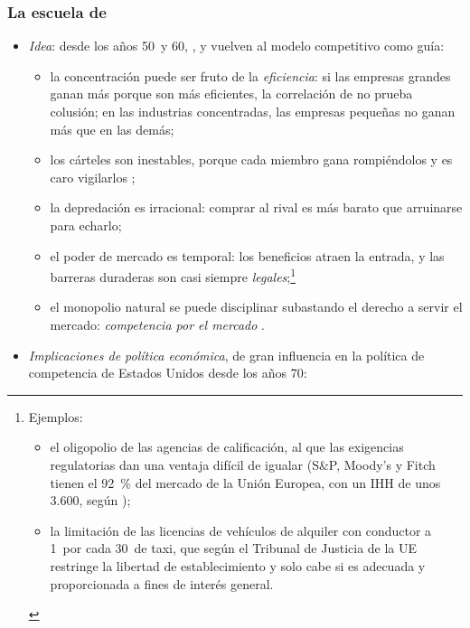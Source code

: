 \documentclass[11pt]{article}
\begin{document}
\subsubsection{La escuela de }\label{sec:chicago}

\begin{itemize}
\item \emph{Idea}: desde los años 50~y 60, \textcite{Stigler1964Theory,Stigler1968Organization}, \textcite{McGee1958Predatory} y \textcite{Demsetz1968Why,Demsetz1973Industry} vuelven al modelo competitivo como guía:
  \begin{itemize}
  \item la concentración puede ser fruto de la \emph{eficiencia}: si las empresas grandes ganan más porque son más eficientes, la correlación de  no prueba colusión; en las industrias concentradas, las empresas pequeñas no ganan más que en las demás\nocite{Demsetz1973Industry};
  \item los cárteles son inestables, porque cada miembro gana rompiéndolos y es caro vigilarlos\nocite{Stigler1964Theory} ;
  \item la depredación es irracional: comprar al rival es más barato que arruinarse para echarlo\nocite{McGee1958Predatory};
  \item el poder de mercado es temporal: los beneficios atraen la entrada, y las barreras duraderas son casi siempre \emph{legales};\footnote{Ejemplos:
\begin{itemize}
\item el oligopolio de las agencias de calificación, al que las exigencias regulatorias dan una ventaja difícil de igualar (S\&P, Moody's y Fitch tienen el 92~\% del mercado de la Unión Europea, con un IHH de unos 3.600, según \textcite{ESMA2025CRA});
\item la limitación de las licencias de vehículos de alquiler con conductor a 1~por cada 30~de taxi, que según el Tribunal de Justicia de la UE restringe la libertad de establecimiento y solo cabe si es adecuada y proporcionada a fines de interés general\nocite{TJUE2023PrestigeLimousine}.
\end{itemize}}
  \item el monopolio natural se puede disciplinar subastando el derecho a servir el mercado: \emph{competencia por el mercado}\nocite{Demsetz1968Why}  .
  \end{itemize}
\item \emph{Implicaciones de política económica}, de gran influencia en la política de competencia de Estados Unidos desde los años 70:

\end{itemize}
\end{document}
